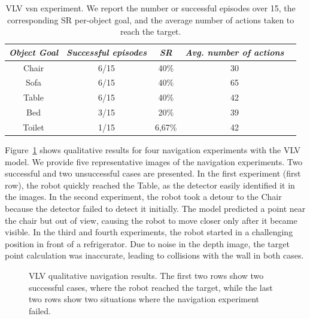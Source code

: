 \begin{table}[t]
\centering
\begin{tabular}{c|cccc}
\toprule
\textit{\textbf{Object Goal}} & \textit{\textbf{Successful episodes}} & \textit{\textbf{SR}} &  \textit{\textbf{Avg. number of actions}}   \\ \midrule
Chair                & 6/15     & 40\%   &   30  \\
Sofa                 & 6/15     & 40\%   &   65  \\
Table                & 6/15     & 40\%   &   42  \\
Bed                  & 3/15     & 20\%   &   39  \\
Toilet               & 1/15     & 6,67\%    &   42  \\ \bottomrule
\end{tabular}
\caption{VLV \acrshort{vsn} experiment. We report the number or successful episodes over 15, the corresponding SR per-object goal, and the average number of actions taken to reach the target.}
\label{tab:vlv}
\end{table}

Figure~\ref{fig:vlv_qualitative} shows qualitative results for four navigation experiments with the VLV model.
We provide five representative images of the navigation experiments.
Two successful and two unsuccessful cases are presented.
In the first experiment (first row), the robot quickly reached the Table, as the detector easily identified it in the images.
In the second experiment, the robot took a detour to the Chair because the detector failed to detect it initially.
The model predicted a point near the chair but out of view, causing the robot to move closer only after it became visible.
In the third and fourth experiments, the robot started in a challenging position in front of a refrigerator.
Due to noise in the depth image, the target point calculation was inaccurate, leading to collisions with the wall in both cases.

\begin{figure}[t]
    \centering
        \caption{VLV qualitative navigation results. The first two rows show two successful cases, where the robot reached the target, while the last two rows show two situations where the navigation experiment failed.}
        \label{fig:vlv_qualitative}
\end{figure}

